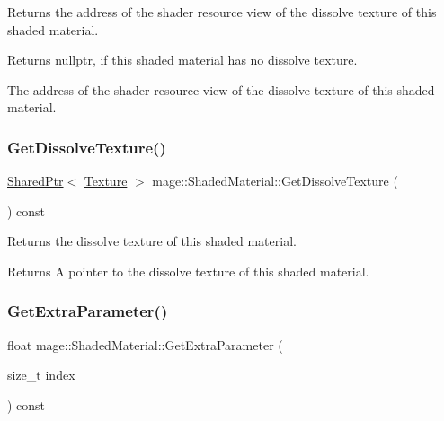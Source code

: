 Returns the address of the shader resource view of the dissolve texture of this shaded material.

\begin{DoxyReturn}{Returns}
{\ttfamily nullptr}, if this shaded material has no dissolve texture. 

The address of the shader resource view of the dissolve texture of this shaded material. 
\end{DoxyReturn}
\hypertarget{structmage_1_1_shaded_material_a442e7331e699f4b21f59e289272a361a}{}\label{structmage_1_1_shaded_material_a442e7331e699f4b21f59e289272a361a} 
\subsubsection{\texorpdfstring{Get\+Dissolve\+Texture()}{GetDissolveTexture()}}
{\footnotesize\ttfamily \hyperlink{namespacemage_a1e01ae66713838a7a67d30e44c67703e}{Shared\+Ptr}$<$ \hyperlink{classmage_1_1_texture}{Texture} $>$ mage\+::\+Shaded\+Material\+::\+Get\+Dissolve\+Texture (\begin{DoxyParamCaption}{ }\end{DoxyParamCaption}) const\hspace{0.3cm}{\ttfamily [noexcept]}}

Returns the dissolve texture of this shaded material.

\begin{DoxyReturn}{Returns}
A pointer to the dissolve texture of this shaded material. 
\end{DoxyReturn}
\hypertarget{structmage_1_1_shaded_material_af2843c2ec63800443e6fee28147cd8bb}{}\label{structmage_1_1_shaded_material_af2843c2ec63800443e6fee28147cd8bb} 
\subsubsection{\texorpdfstring{Get\+Extra\+Parameter()}{GetExtraParameter()}}
{\footnotesize\ttfamily float mage\+::\+Shaded\+Material\+::\+Get\+Extra\+Parameter (\begin{DoxyParamCaption}\item[{size\+\_\+t}]{index }\end{DoxyParamCaption}) const\hspace{0.3cm}{\ttfamily [noexcept]}}

